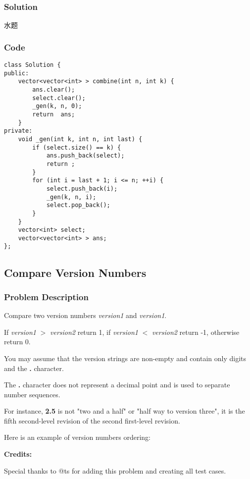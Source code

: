 \documentclass{article}
\begin{document}
\begin{CJK*}{UTF8}{gkai}

\subsubsection*{Solution}
水题

\subsubsection*{Code}
\begin{lstlisting}
class Solution {
public:
    vector<vector<int> > combine(int n, int k) {
        ans.clear();
        select.clear();
        _gen(k, n, 0);
        return  ans;
    }
private:
    void _gen(int k, int n, int last) {
        if (select.size() == k) {
            ans.push_back(select);
            return ;
        }
        for (int i = last + 1; i <= n; ++i) {
            select.push_back(i);
            _gen(k, n, i);
            select.pop_back();
        }
    }
    vector<int> select;
    vector<vector<int> > ans;
}; 
\end{lstlisting}


\subsection{ Compare Version Numbers }
\label{ Compare Version Numbers }

\subsubsection*{Problem Description}
Compare two version numbers \emph{version1} and \emph{version1}.


If \emph{version1} $>$ \emph{version2} return 1, if \emph{version1} $<$ \emph{version2} return -1, otherwise return 0.

You may assume that the version strings are non-empty and contain only digits and the \textbf{.} character.


The \textbf{.} character does not represent a decimal point and is used to separate number sequences.


For instance, \textbf{2.5} is not "two and a half" or "half way to version three", it is the fifth second-level revision of the second first-level revision.

Here is an example of version numbers ordering:

\textbf{Credits:}

Special thanks to @ts for adding this problem and creating all test cases.


\end{CJK*}
\end{document}
